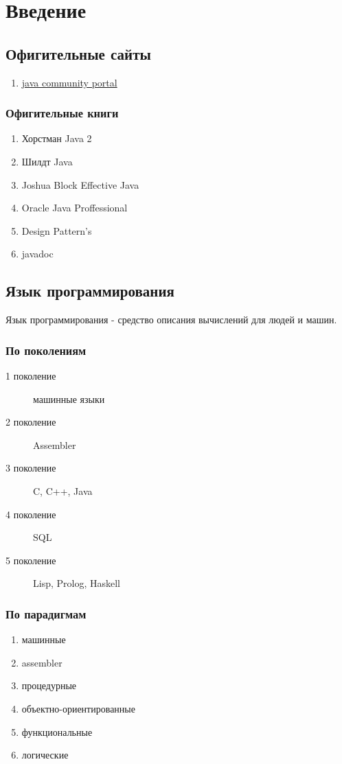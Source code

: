 \chapter{Введение}
\section{Офигительные сайты}

\begin{enumerate}
    \item \href{http://jcp.org}{java community portal}
\end{enumerate}


\subsection{Офигительные книги}
\begin{enumerate}
  \item Хорстман Java 2
  \item Шилдт Java
  \item Joshua Block Effective Java
  \item Oracle Java Proffessional
  \item Design Pattern's
  \item javadoc
\end{enumerate}

\section{Язык программирования}
\begin{definition}
  Язык программирования - средство описания вычислений для людей и машин.
\end{definition}

\subsection{По поколениям}
\begin{description}
  \item[1 поколение] машинные языки
  \item[2 поколение] Assembler
  \item[3 поколение] C, C++, Java
  \item[4 поколение] SQL
  \item[5 поколение] Lisp, Prolog, Haskell
\end{description}

\subsection{По парадигмам}
\begin{enumerate}
  \item машинные
  \item assembler
  \item процедурные
  \item объектно-ориентированные
  \item функциональные
  \item логические
\end{enumerate}

